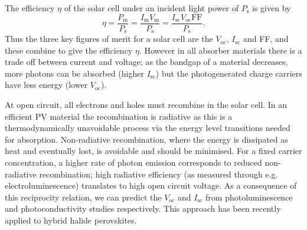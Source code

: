 The efficiency $\eta$ of the solar cell under an incident light power of $P_\textrm{s}$ is given by
\begin{equation}
    \eta = \frac{P_\textrm{m}}{P_\textrm{s}} = \frac{I_\textrm{m} V_\textrm{m}}{P_\textrm{s}} = \frac{I_\textrm{sc} V_\textrm{oc} \textrm{FF}}{P_\textrm{s}}.
\end{equation}
Thus the three key figures of merit for a solar cell are the $V_\textrm{oc}$, $I_\textrm{sc}$ and FF, and these combine to give the efficiency $\eta$. 
However in all absorber materials there is a trade off between current and voltage; as the bandgap of a material decreases, more photons can be absorbed (higher $I_\textrm{sc}$) but the photogenerated charge carriers have less energy (lower $V_\textrm{oc}$).

At open circuit, all electrons and holes must recombine in the solar cell. In an efficient PV material the recombination is radiative as this is a thermodynamically unavoidable process via the energy level transitions needed for absorption. Non-radiative recombination, where the energy is dissipated as heat and eventually lost, is avoidable and should be minimised. For a fixed carrier concentration, a higher rate of photon emission corresponds to reduced non-radiative recombination; high radiative efficiency (as measured through e.g. electroluminescence) translates to high open circuit voltage.\autocite{Rau2007}
As a consequence of this reciprocity relation, we can predict the $V_\textrm{oc}$ and $I_\textrm{sc}$ from photoluminescence and photoconductivity studies respectively. This approach has been recently applied to hybrid halide perovskites.\autocite{Braly2018}



